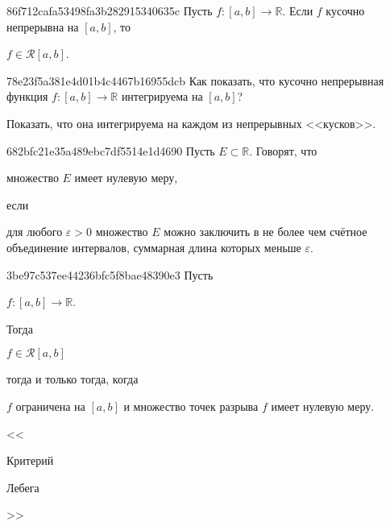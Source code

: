 \begin{note}{86f712cafa53498fa3b282915340635c}
    Пусть \({ f : [a, b] \to \mathbb R }\). Если \({ f }\) кусочно непрерывна на \({ [a, b] }\), то \begin{icloze}{1}\({ f \in \mathcal R[a, b] }\).\end{icloze}
\end{note}

\begin{note}{78e23f5a381e4d01b4c4467b16955dcb}
    Как показать, что кусочно непрерывная функция \({ f : [a, b] \to \mathbb R }\) интегрируема на \({ [a, b] }\)?

    \begin{cloze}{1}
        Показать, что она интегрируема на каждом из непрерывных <<кусков>>.
    \end{cloze}
\end{note}

\begin{note}{682bfc21e35a489ebc7df5514e1d4690}
    Пусть \({ E \subset \mathbb R }\). Говорят, что \begin{icloze}{2}множество \({ E }\) имеет нулевую меру,\end{icloze} если \begin{icloze}{1}для любого \({ \varepsilon > 0 }\) множество \({ E }\) можно заключить  в не более чем счётное объединение интервалов, суммарная длина которых меньше \({ \varepsilon }\).\end{icloze}
\end{note}

\begin{note}{3be97c537ee44236bfc5f8bae48390e3}
    Пусть \begin{icloze}{5}\({ f : [a, b]  \to \mathbb R }\).\end{icloze}
    Тогда \begin{icloze}{2}\({ f \in \mathcal R[a, b] }\)\end{icloze} \begin{icloze}{3}тогда и только тогда, когда\end{icloze} \begin{icloze}{1}\({ f }\) ограничена на \({ [a, b] }\) и множество точек  разрыва \({ f }\) имеет нулевую меру.\end{icloze}

    \begin{center}
        \tiny
        <<\begin{icloze}{3}Критерий\end{icloze} \begin{icloze}{4}Лебега\end{icloze}>>
    \end{center}
\end{note}

